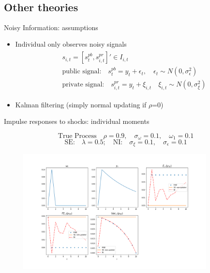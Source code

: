\documentclass{beamer}
\begin{document}
\subsection{Other theories}

\begin{frame}{Noisy Information: assumptions}
\begin{itemize}
	\item Individual only observes noisy signals 
	\begin{eqnarray*}
		\begin{aligned}
			& s_{i,t}=[s^{pb}_t, s^{pr}_{i,t}]' \in I_{i,t} \\
			&\text{public signal:} \quad s^{pb}_t = y_t + \epsilon_t, \quad \epsilon_t \sim N(0,\sigma^2_\epsilon)\\ 
			& \text{private signal:} \quad s^{pr}_{i,t} = y_t + \xi_{i,t} \quad \xi_{i,t} \sim N(0,\sigma^2_\xi)
		\end{aligned}
	\end{eqnarray*} 
   
	\item Kalman filtering (simply normal updating if $\rho$=0)
\end{itemize}
\end{frame}



\begin{frame}{Impulse responses to shocks: individual moments}


$$\textrm{True Process} \quad   \rho=0.9, \quad \sigma_\omega= 0.1, \quad \omega_1 = 0.1$$
$$ \textrm{SE:} \quad  \lambda = 0.5; \quad \textrm{NI:} \quad \sigma_\xi = 0.1, \quad \sigma_\epsilon = 0.1$$

\begin{figure}
	\includegraphics[height=6.3cm,width=10cm]{figures/ir_indseni} 
\end{figure}

\end{frame}
\end{document}
